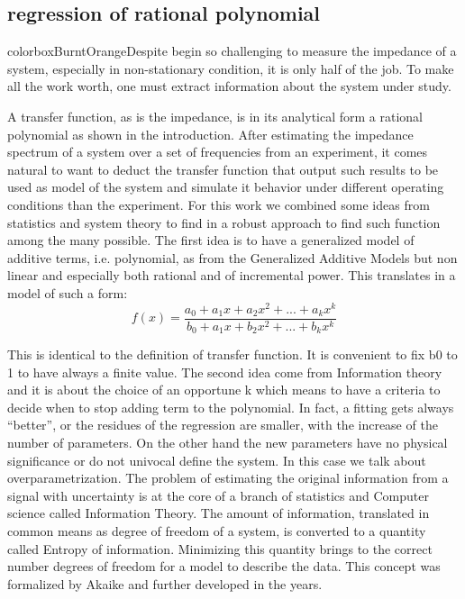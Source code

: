 \subsection{regression of rational polynomial}

colorbox{BurntOrange}{Despite begin so challenging to measure the impedance of a system, especially in non-stationary condition, it is only half of the job. To make all the work worth, one must extract information about the system under study.}

A transfer function, as is the impedance, is in its analytical form a rational polynomial as shown in the introduction. After estimating the impedance spectrum of a system over a set of frequencies from an experiment, it comes natural to want to deduct the transfer function that output such results to be used as model of the system and simulate it behavior under different operating conditions than the experiment. For this work we combined some ideas from statistics and system theory to find in a robust approach to find such function among the many possible. The first idea is to have a generalized model of additive terms, i.e. polynomial, as from the Generalized Additive Models but non linear and especially both rational and of incremental power. This translates in a model of such a form:
\begin{equation}
    f(x) = \frac{a_0+a_1x+a_2x^2+...+a_kx^k}{b_0+a_1x+b_2x^2+...+b_kx^k}
\end{equation}

This is identical to the definition of transfer function. It is convenient to fix b0 to 1 to have always a finite value. The second idea come from Information theory and it is about the choice of an opportune k which means to have a criteria to decide when to stop adding term to the polynomial. In fact, a fitting gets always “better”, or the residues of the regression are smaller, with the increase of the number of parameters. On the other hand the new parameters have no physical significance or do not univocal define the system. In this case we talk about overparametrization. The problem of estimating the original information from a signal with uncertainty is at the core of a branch of statistics and Computer science called Information Theory. The amount of information, translated in common means as degree of freedom of a system, is converted to a quantity called Entropy of information. Minimizing this quantity brings to the correct number degrees of freedom for a model to describe the data. This concept was formalized by Akaike and further developed in the years. 

